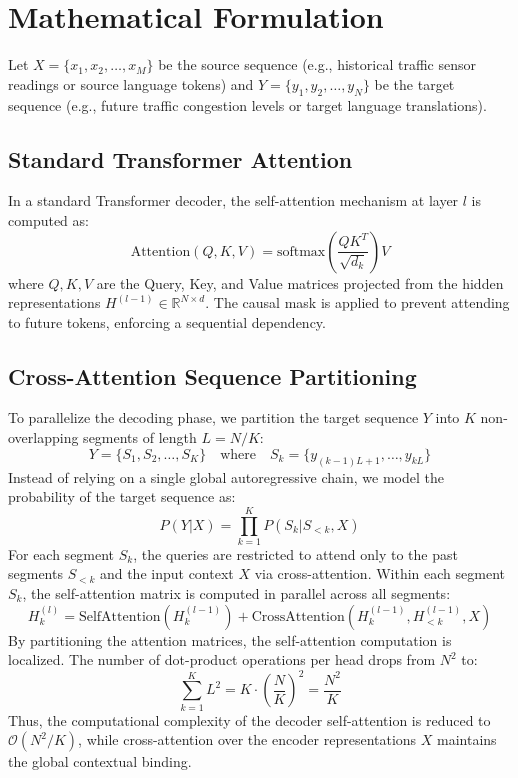\documentclass[11pt,a4paper]{article}
\begin{document}
\section{Mathematical Formulation}
Let $X = \{x_1, x_2, \dots, x_M\}$ be the source sequence (e.g., historical traffic sensor readings or source language tokens) and $Y = \{y_1, y_2, \dots, y_N\}$ be the target sequence (e.g., future traffic congestion levels or target language translations).

\subsection{Standard Transformer Attention}
In a standard Transformer decoder, the self-attention mechanism at layer $l$ is computed as:
\begin{equation}
    \text{Attention}(Q, K, V) = \text{softmax}\left(\frac{QK^T}{\sqrt{d_k}}\right)V
\end{equation}
where $Q, K, V$ are the Query, Key, and Value matrices projected from the hidden representations $H^{(l-1)} \in \mathbb{R}^{N \times d}$. The causal mask is applied to prevent attending to future tokens, enforcing a sequential dependency.

\subsection{Cross-Attention Sequence Partitioning}
To parallelize the decoding phase, we partition the target sequence $Y$ into $K$ non-overlapping segments of length $L = N/K$:
\begin{equation}
    Y = \{S_1, S_2, \dots, S_K\} \quad \text{where} \quad S_k = \{y_{(k-1)L+1}, \dots, y_{kL}\}
\end{equation}
Instead of relying on a single global autoregressive chain, we model the probability of the target sequence as:
\begin{equation}
    P(Y|X) = \prod_{k=1}^K P(S_k | S_{<k}, X)
\end{equation}
For each segment $S_k$, the queries are restricted to attend only to the past segments $S_{<k}$ and the input context $X$ via cross-attention. Within each segment $S_k$, the self-attention matrix is computed in parallel across all segments:
\begin{equation}
    H_k^{(l)} = \text{SelfAttention}(H_k^{(l-1)}) + \text{CrossAttention}(H_k^{(l-1)}, H_{<k}^{(l-1)}, X)
\end{equation}
By partitioning the attention matrices, the self-attention computation is localized. The number of dot-product operations per head drops from $N^2$ to:
\begin{equation}
    \sum_{k=1}^K L^2 = K \cdot \left(\frac{N}{K}\right)^2 = \frac{N^2}{K}
\end{equation}
Thus, the computational complexity of the decoder self-attention is reduced to $\mathcal{O}(N^2/K)$, while cross-attention over the encoder representations $X$ maintains the global contextual binding.
\end{document}

